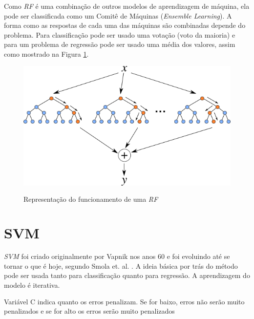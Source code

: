 Como \textit{\acrshort{RF}} é uma combinação de outros modelos de aprendizagem de máquina, ela pode ser classificada como um Comitê de Máquinas (\textit{Ensemble Learning}). A forma como as respostas de cada uma das máquinas são combinadas depende do problema. Para classificação pode ser usado uma votação (voto da maioria) e para um problema de regressão pode ser usado uma média dos valores, assim como mostrado na Figura \ref{figure:random_forest}.

\begin{figure}[htbp]
    \centering
    \includegraphics[scale=1.0]{monography/img/models/random_forest.png}
    \label{figure:random_forest}
    \caption[Representação do funcionamento de uma \textit{\acrshort{RF}}]{Representação do funcionamento de uma \textit{\acrshort{RF}}\footnotemark}
\end{figure}


\section{\acrfull{SVM}}

\textit{\acrshort{SVM}} foi criado originalmente por Vapnik nos anos 60 e foi evoluindo até se tornar o que é hoje, segundo Smola et. al. \cite{Smola03atutorial}. A ideia básica por trás do método pode ser usada tanto para classificação quanto para regressão. A aprendizagem do modelo é iterativa.

Variável C indica quanto os erros penalizam. Se for baixo, erros não serão muito penalizados e se for alto os erros serão muito penalizados

